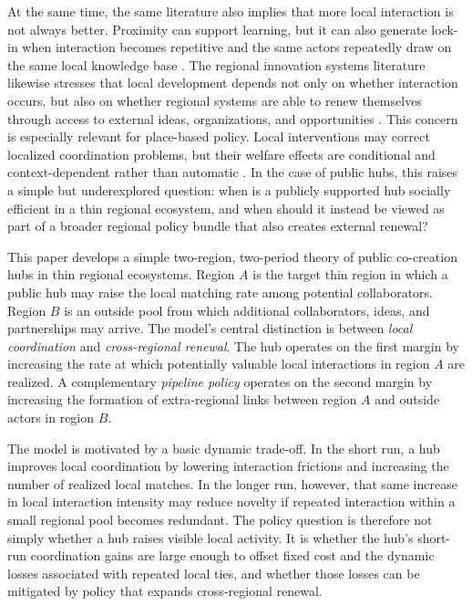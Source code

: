 At the same time, the same literature also implies that more local interaction is not always better. Proximity can support learning, but it can also generate lock-in when interaction becomes repetitive and the same actors repeatedly draw on the same local knowledge base \citep{Boschma2005,TorreRallet2005}. The regional innovation systems literature likewise stresses that local development depends not only on whether interaction occurs, but also on whether regional systems are able to renew themselves through access to external ideas, organizations, and opportunities \citep{CookeUrangaEtxebarria1997,AsheimLawtonSmithOughton2011,TodtlingTrippl2005}. This concern is especially relevant for place-based policy. Local interventions may correct localized coordination problems, but their welfare effects are conditional and context-dependent rather than automatic \citep{KlineMoretti2014ARE,NeumarkSimpson2015}. In the case of public hubs, this raises a simple but underexplored question: when is a publicly supported hub socially efficient in a thin regional ecosystem, and when should it instead be viewed as part of a broader regional policy bundle that also creates external renewal?

This paper develops a simple two-region, two-period theory of public co-creation hubs in thin regional ecosystems. Region $A$ is the target thin region in which a public hub may raise the local matching rate among potential collaborators. Region $B$ is an outside pool from which additional collaborators, ideas, and partnerships may arrive. The model's central distinction is between \emph{local coordination} and \emph{cross-regional renewal}. The hub operates on the first margin by increasing the rate at which potentially valuable local interactions in region $A$ are realized. A complementary \emph{pipeline policy} operates on the second margin by increasing the formation of extra-regional links between region $A$ and outside actors in region $B$.

The model is motivated by a basic dynamic trade-off. In the short run, a hub improves local coordination by lowering interaction frictions and increasing the number of realized local matches. In the longer run, however, that same increase in local interaction intensity may reduce novelty if repeated interaction within a small regional pool becomes redundant. The policy question is therefore not simply whether a hub raises visible local activity. It is whether the hub's short-run coordination gains are large enough to offset fixed cost and the dynamic losses associated with repeated local ties, and whether those losses can be mitigated by policy that expands cross-regional renewal.

